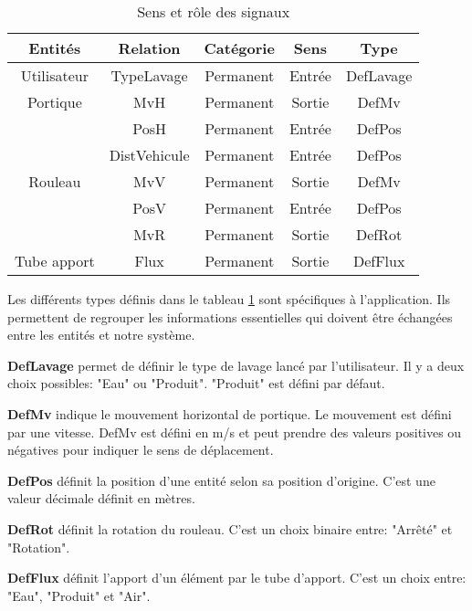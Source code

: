\begin{table}[H]
	\centering
	\begin{tabular}{|c|c|c|c|c|}
		\hline
		Entités                       & Relation  & Catégorie    & Sens   & Type           \\
		\hline
		Utilisateur                   & TypeLavage  & Permanent    & Entrée   & DefLavage  \\
		\hline
		Portique                      & MvH  & Permanent    & Sortie   & DefMv             \\
									  & PosH  & Permanent    & Entrée   & DefPos           \\
									  & DistVehicule  & Permanent    & Entrée   & DefPos   \\
		\hline
		Rouleau                       & MvV  & Permanent    & Sortie   & DefMv             \\
									  & PosV  & Permanent    & Entrée   & DefPos           \\
									  & MvR  & Permanent    & Sortie   & DefRot            \\
    	\hline
		Tube apport                   & Flux  & Permanent    & Sortie   & DefFlux          \\
		\hline
	\end{tabular}
	\caption{Sens et rôle des signaux}
	\label{tab:entrees_sorties_composant}
\end{table}

Les différents types définis dans le tableau \ref{tab:entrees_sorties_composant} sont spécifiques à l'application.
Ils permettent de regrouper les informations essentielles qui doivent être échangées entre les entités et notre système.

\textbf{DefLavage} permet de définir le type de lavage lancé par l'utilisateur.
Il y a deux choix possibles: "Eau" ou "Produit". 
"Produit" est défini par défaut.

\textbf{DefMv} indique le mouvement horizontal de portique.
Le mouvement est défini par une vitesse.
DefMv est défini en m/s et peut prendre des valeurs positives ou négatives pour indiquer le sens de déplacement. 

\textbf{DefPos} définit la position d'une entité selon sa position d'origine.
C'est une valeur décimale définit en mètres.

\textbf{DefRot} définit la rotation du rouleau.
C'est un choix binaire entre: "Arrêté" et "Rotation".

\textbf{DefFlux} définit l'apport d'un élément par le tube d'apport.
C'est un choix entre: "Eau", "Produit" et "Air".


